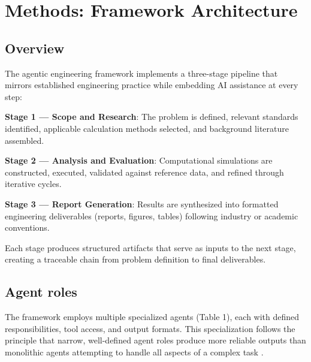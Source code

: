 \documentclass[review,3p]{elsarticle}
\begin{document}
\section{Methods: Framework Architecture}


\subsection{Overview}

The agentic engineering framework implements a three-stage pipeline that mirrors established engineering practice while embedding AI assistance at every step:

\textbf{Stage 1 --- Scope and Research}: The problem is defined, relevant standards identified, applicable calculation methods selected, and background literature assembled.

\textbf{Stage 2 --- Analysis and Evaluation}: Computational simulations are constructed, executed, validated against reference data, and refined through iterative cycles.

\textbf{Stage 3 --- Report Generation}: Results are synthesized into formatted engineering deliverables (reports, figures, tables) following industry or academic conventions.

Each stage produces structured artifacts that serve as inputs to the next stage, creating a traceable chain from problem definition to final deliverables.

\subsection{Agent roles}

The framework employs multiple specialized agents (Table 1), each with defined responsibilities, tool access, and output formats. This specialization follows the principle that narrow, well-defined agent roles produce more reliable outputs than monolithic agents attempting to handle all aspects of a complex task \citep{Ferrag2025}.
\end{document}
